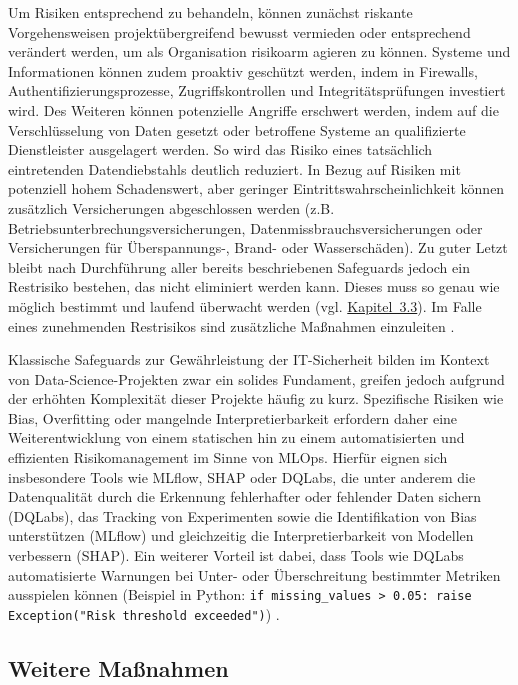 Um Risiken entsprechend zu behandeln, können zunächst riskante Vorgehensweisen projektübergreifend bewusst vermieden oder entsprechend verändert werden,
 um als Organisation risikoarm agieren zu können. Systeme und Informationen können zudem proaktiv geschützt werden, 
 indem in Firewalls, Authentifizierungsprozesse, Zugriffskontrollen und Integritätsprüfungen investiert wird. Des Weiteren 
 können potenzielle Angriffe erschwert werden, indem auf die Verschlüsselung von Daten gesetzt oder betroffene Systeme an qualifizierte 
 Dienstleister ausgelagert werden. So wird das Risiko eines tatsächlich eintretenden Datendiebstahls deutlich reduziert. In Bezug auf Risiken
  mit potenziell hohem Schadenswert, aber geringer Eintrittswahrscheinlichkeit können zusätzlich Versicherungen abgeschlossen werden 
  (z.B. Betriebsunterbrechungsversicherungen, Datenmissbrauchsversicherungen oder Versicherungen für Überspannungs-, Brand- oder Wasserschäden).
   Zu guter Letzt bleibt nach Durchführung aller bereits beschriebenen Safeguards jedoch ein Restrisiko bestehen, das nicht eliminiert werden kann. 
   Dieses muss so genau wie möglich bestimmt und laufend überwacht werden (vgl. \hyperref[sec:risiko_monitoring]{Kapitel~3.3}). Im Falle eines zunehmenden Restrisikos sind zusätzliche Maßnahmen einzuleiten \cite{Kersten_27001_2019}.

Klassische Safeguards zur Gewährleistung der IT-Sicherheit bilden im Kontext von Data-Science-Projekten zwar ein solides Fundament,
greifen jedoch aufgrund der erhöhten Komplexität dieser Projekte häufig zu kurz. Spezifische Risiken wie Bias, Overfitting oder mangelnde
Interpretierbarkeit erfordern daher eine Weiterentwicklung von einem statischen hin zu einem automatisierten und effizienten Risikomanagement
im Sinne von MLOps. Hierfür eignen sich insbesondere Tools wie MLflow, SHAP oder DQLabs, die unter anderem die Datenqualität durch die Erkennung 
fehlerhafter oder fehlender Daten sichern (DQLabs), das Tracking von Experimenten sowie die Identifikation von Bias unterstützen (MLflow) und gleichzeitig 
die Interpretierbarkeit von Modellen verbessern (SHAP). Ein weiterer Vorteil ist dabei, dass Tools wie DQLabs automatisierte Warnungen bei Unter- oder Überschreitung bestimmter Metriken ausspielen können (Beispiel in Python: \verb|if missing_values > 0.05: raise Exception("Risk threshold exceeded")|) \cite{Lahiri_2024}.

\subsection{Weitere Maßnahmen}

